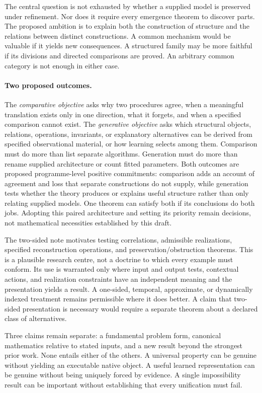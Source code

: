 \documentclass[11pt]{article}
\theoremstyle{remark}
\begin{document}
The central question is not exhausted by whether a supplied model is preserved under refinement. Nor does it require every emergence theorem to discover parts. The proposed ambition is to explain both the construction of structure and the relations between distinct constructions. A common mechanism would be valuable if it yields new consequences. A structured family may be more faithful if its divisions and directed comparisons are proved. An arbitrary common category is not enough in either case.

\paragraph{Two proposed outcomes.}
The \emph{comparative objective} asks why two procedures agree, when a meaningful translation exists only in one direction, what it forgets, and when a specified comparison cannot exist. The \emph{generative objective} asks which structural objects, relations, operations, invariants, or explanatory alternatives can be derived from specified observational material, or how learning selects among them. Comparison must do more than list separate algorithms. Generation must do more than rename supplied architecture or count fitted parameters. Both outcomes are proposed programme-level positive commitments: comparison adds an account of agreement and loss that separate constructions do not supply, while generation tests whether the theory produces or explains useful structure rather than only relating supplied models. One theorem can satisfy both if its conclusions do both jobs. Adopting this paired architecture and setting its priority remain decisions, not mathematical necessities established by this draft.

The two-sided note \cite{TwoSidedNote} motivates testing correlations, admissible realizations, specified reconstruction operations, and preservation/obstruction theorems. This is a plausible research centre, not a doctrine to which every example must conform. Its use is warranted only where input and output tests, contextual actions, and realization constraints have an independent meaning and the presentation yields a result. A one-sided, temporal, approximate, or dynamically indexed treatment remains permissible where it does better. A claim that two-sided presentation is necessary would require a separate theorem about a declared class of alternatives.

Three claims remain separate: a fundamental problem form, canonical mathematics relative to stated inputs, and a new result beyond the strongest prior work. None entails either of the others. A universal property can be genuine without yielding an executable native object. A useful learned representation can be genuine without being uniquely forced by evidence. A single impossibility result can be important without establishing that every unification must fail.
\end{document}
